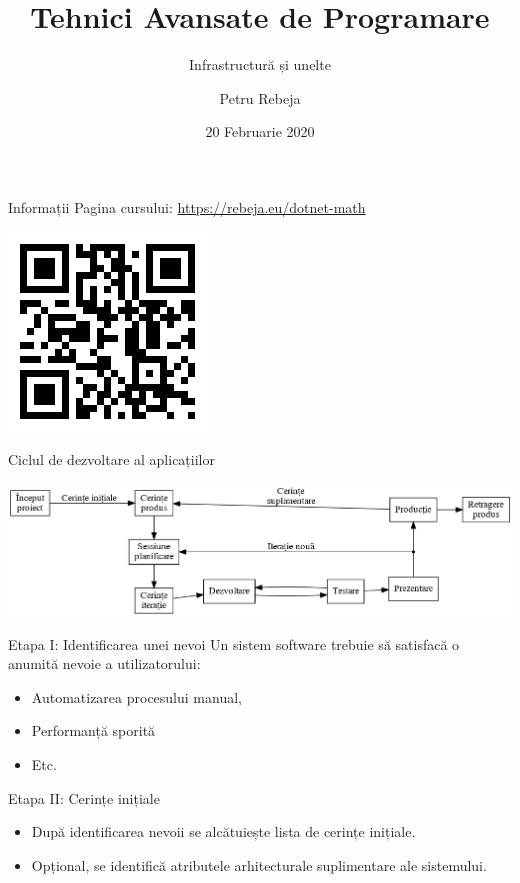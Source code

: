 \documentclass[presentation]{beamer}
\author{Petru Rebeja}
\date{20 Februarie 2020}
\title{Tehnici Avansate de Programare}
\subtitle{Infrastructură și unelte}
\institute[UAIC]{Facultatea de Matematică\\Universitatea Alexandru Ioan Cuza, Iași}
\begin{document}
\maketitle
\begin{frame}[label={sec:org3f6344d}]{Informații}
Pagina cursului: \url{https://rebeja.eu/dotnet-math}

\begin{center}
\includegraphics[height=0.6\textheight]{img/qr-pagina-curs.png}
\end{center}
\end{frame}
\begin{frame}[label={sec:orgfa1be4e}]{Ciclul de dezvoltare al aplicațiilor}
\begin{center}
\includegraphics[width=\textwidth]{./img/ciclul-agile.png}
\end{center}
\end{frame}
\begin{frame}[label={sec:org6bc8040}]{Etapa I: Identificarea unei nevoi}
Un sistem software trebuie să satisfacă o anumită nevoie a utilizatorului:
\begin{itemize}
\item Automatizarea procesului manual,
\item Performanță sporită
\item Etc.
\end{itemize}
\end{frame}
\begin{frame}[label={sec:orgce7872c}]{Etapa II: Cerințe inițiale}
\begin{itemize}
\item După identificarea nevoii se alcătuiește lista de cerințe inițiale.
\item Opțional, se identifică atributele arhitecturale suplimentare ale sistemului.
\end{itemize}
\end{frame}
\end{document}
